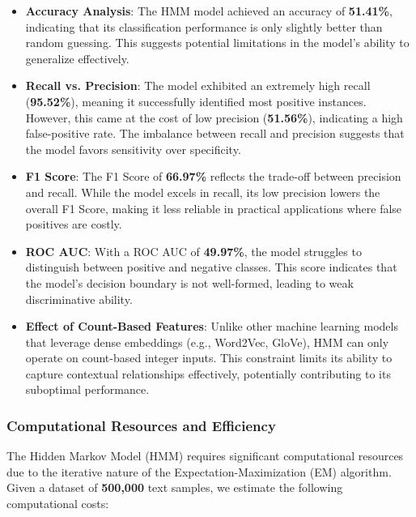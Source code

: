 \begin{itemize}
    \item \textbf{Accuracy Analysis}: The HMM model achieved an accuracy of \textbf{51.41\%}, indicating that its classification performance is only slightly better than random guessing. This suggests potential limitations in the model's ability to generalize effectively.
    
    \item \textbf{Recall vs. Precision}: The model exhibited an extremely high recall (\textbf{95.52\%}), meaning it successfully identified most positive instances. However, this came at the cost of low precision (\textbf{51.56\%}), indicating a high false-positive rate. The imbalance between recall and precision suggests that the model favors sensitivity over specificity.
    
    \item \textbf{F1 Score}: The F1 Score of \textbf{66.97\%} reflects the trade-off between precision and recall. While the model excels in recall, its low precision lowers the overall F1 Score, making it less reliable in practical applications where false positives are costly.
    
    \item \textbf{ROC AUC}: With a ROC AUC of \textbf{49.97\%}, the model struggles to distinguish between positive and negative classes. This score indicates that the model's decision boundary is not well-formed, leading to weak discriminative ability.
    
    \item \textbf{Effect of Count-Based Features}: Unlike other machine learning models that leverage dense embeddings (e.g., Word2Vec, GloVe), HMM can only operate on count-based integer inputs. This constraint limits its ability to capture contextual relationships effectively, potentially contributing to its suboptimal performance.
\end{itemize}

\subsubsection{Computational Resources and Efficiency}

The Hidden Markov Model (HMM) requires significant computational resources due to the iterative nature of the Expectation-Maximization (EM) algorithm. Given a dataset of \textbf{500,000} text samples, we estimate the following computational costs:


